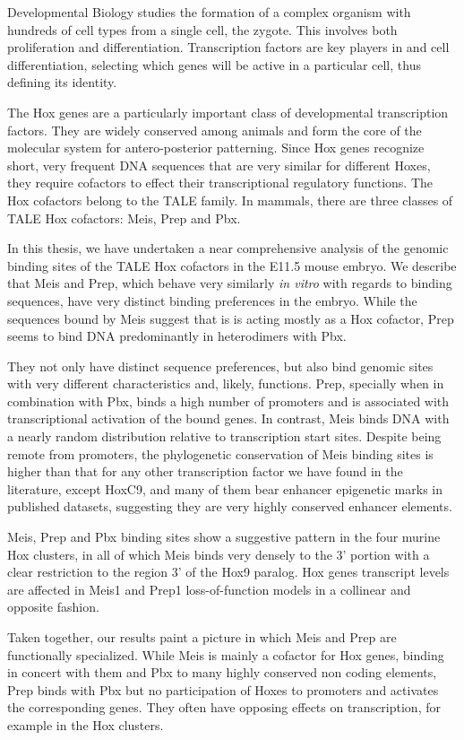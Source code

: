 Developmental Biology studies the formation of a complex organism with hundreds of cell types from a single cell, the zygote. This involves both proliferation and differentiation. Transcription factors are key players in and cell differentiation, selecting which genes will be active in a particular cell, thus defining its identity. 

The Hox genes are a particularly important class of developmental transcription factors. They are widely conserved among animals and form the core of the molecular system for antero-posterior patterning. Since Hox genes recognize short, very frequent DNA sequences that are very similar for different Hoxes, they require cofactors to effect their transcriptional regulatory functions. The Hox cofactors belong to the TALE family. In mammals, there are three classes of TALE Hox cofactors: Meis, Prep and Pbx. 

In this thesis, we have undertaken a near comprehensive analysis of the genomic binding sites of the TALE Hox cofactors in the E11.5 mouse embryo. We describe that Meis and Prep, which behave very similarly \textit{in vitro} with regards to binding sequences, have very distinct binding preferences in the embryo. While the sequences bound by Meis suggest that is is acting mostly as a Hox cofactor, Prep seems to bind DNA predominantly in heterodimers with Pbx. 

They not only have distinct sequence preferences, but also bind genomic sites with very different characteristics and, likely, functions. Prep, specially when in combination with Pbx, binds a high number of promoters and is associated with transcriptional activation of the bound genes. In contrast, Meis binds DNA with a nearly random distribution relative to transcription start sites. Despite being remote from promoters, the phylogenetic conservation of Meis binding sites is higher than that for any other transcription factor we have found in the literature, except HoxC9, and many of them bear enhancer epigenetic marks in published datasets, suggesting they are very highly conserved enhancer elements. 

Meis, Prep and Pbx binding sites show a suggestive pattern in the four murine Hox clusters, in all of which Meis binds very densely to the 3' portion with a clear restriction to the region 3' of the Hox9 paralog. Hox genes transcript levels are affected in Meis1 and Prep1 loss-of-function models in a collinear and opposite fashion. 

Taken together, our results paint a picture in which Meis and Prep are functionally specialized. While Meis is mainly a cofactor for Hox genes, binding in concert with them and Pbx to many highly conserved non coding elements, Prep binds with Pbx but no participation of Hoxes to promoters and activates the corresponding genes. They often have opposing effects on transcription, for example in the Hox clusters. 




